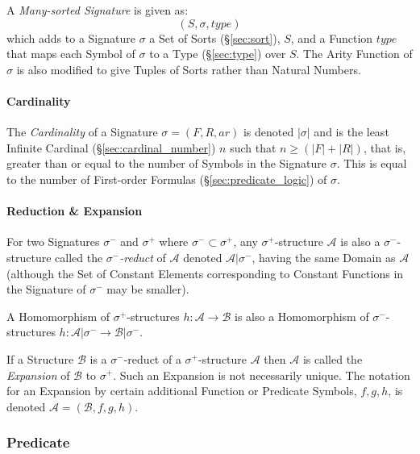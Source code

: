 A \emph{Many-sorted Signature} is given as:
\[
  (S, \sigma, type)
\]
which adds to a Signature $\sigma$ a Set of Sorts (\S\ref{sec:sort}),
$S$, and a Function $type$ that maps each Symbol of $\sigma$ to a Type
(\S\ref{sec:type}) over $S$. The Arity Function of $\sigma$ is also
modified to give Tuples of Sorts rather than Natural Numbers.



\paragraph{Cardinality}\label{sec:signature_cardinality}\hfill

The \emph{Cardinality} of a Signature $\sigma = (F,R,ar)$ is denoted
$|\sigma|$ and is the least Infinite Cardinal
(\S\ref{sec:cardinal_number}) $n$ such that $n \geq (|F| + |R|)$, that
is, greater than or equal to the number of Symbols in the Signature
$\sigma$. This is equal to the number of First-order Formulas
(\S\ref{sec:predicate_logic}) of $\sigma$.



\paragraph{Reduction \& Expansion}\label{sec:reduct_expansion}\hfill

For two Signatures $\sigma^-$ and $\sigma^+$ where $\sigma^- \subset
\sigma^+$, any $\sigma^+$-structure $\mathcal{A}$ is also a
$\sigma^-$-structure called the \emph{$\sigma^-$-reduct} of
$\mathcal{A}$ denoted $\mathcal{A}|\sigma^-$, having the same Domain
as $\mathcal{A}$ (although the Set of Constant Elements corresponding
to Constant Functions in the Signature of $\sigma^-$ may be smaller).

A Homomorphism of $\sigma^+$-structures $h : \mathcal{A} \rightarrow
\mathcal{B}$ is also a Homomorphism of $\sigma^-$-structures $h :
\mathcal{A} | \sigma^- \rightarrow \mathcal{B} | \sigma^-$.

If a Structure $\mathcal{B}$ is a $\sigma^-$-reduct of a
$\sigma^+$-structure $\mathcal{A}$ then $\mathcal{A}$ is called the
\emph{Expansion} of $\mathcal{B}$ to $\sigma^+$. Such an Expansion is
not necessarily unique. The notation for an Expansion by certain
additional Function or Predicate Symbols, $f, g, h$, is denoted
$\mathcal{A} = (\mathcal{B}, f, g, h)$.



\subsubsection{Predicate}\label{sec:predicate}

